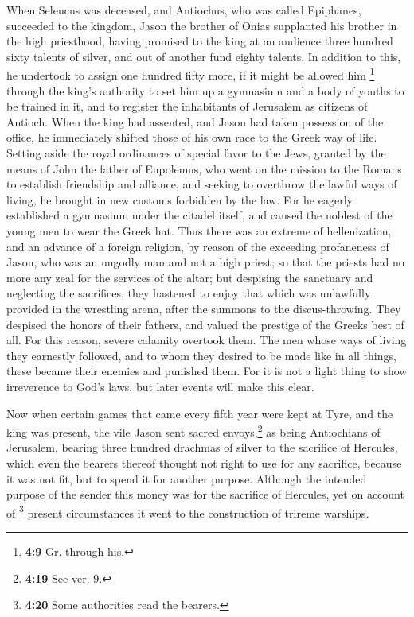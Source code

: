  When Seleucus was deceased, and Antiochus, who was called
Epiphanes, succeeded to the kingdom, Jason the brother of Onias
supplanted his brother in the high priesthood,  having
promised to the king at an audience three hundred sixty talents of
silver, and out of another fund eighty talents.  In
addition to this, he undertook to assign one hundred fifty more, if it
might be allowed him \footnote{\textbf{4:9} Gr. through his.} through
the king's authority to set him up a gymnasium and a body of youths to
be trained in it, and to register the inhabitants of Jerusalem as
citizens of Antioch.  When the king had assented, and
Jason had taken possession of the office, he immediately shifted those
of his own race to the Greek way of life.  Setting aside
the royal ordinances of special favor to the Jews, granted by the means
of John the father of Eupolemus, who went on the mission to the Romans
to establish friendship and alliance, and seeking to overthrow the
lawful ways of living, he brought in new customs forbidden by the law.
 For he eagerly established a gymnasium under the citadel
itself, and caused the noblest of the young men to wear the Greek hat.
 Thus there was an extreme of hellenization, and an
advance of a foreign religion, by reason of the exceeding profaneness of
Jason, who was an ungodly man and not a high priest;  so
that the priests had no more any zeal for the services of the altar; but
despising the sanctuary and neglecting the sacrifices, they hastened to
enjoy that which was unlawfully provided in the wrestling arena, after
the summons to the discus-throwing.  They despised the
honors of their fathers, and valued the prestige of the Greeks best of
all.  For this reason, severe calamity overtook them. The
men whose ways of living they earnestly followed, and to whom they
desired to be made like in all things, these became their enemies and
punished them.  For it is not a light thing to show
irreverence to God's laws, but later events will make this clear.

 Now when certain games that came every fifth year were
kept at Tyre, and the king was present,  the vile Jason
sent sacred envoys,\footnote{\textbf{4:19} See ver. 9.} as being
Antiochians of Jerusalem, bearing three hundred drachmas of silver to
the sacrifice of Hercules, which even the bearers thereof thought not
right to use for any sacrifice, because it was not fit, but to spend it
for another purpose.  Although the intended purpose of
the sender this money was for the sacrifice of Hercules, yet on account
of \footnote{\textbf{4:20} Some authorities read the bearers.} present
circumstances it went to the construction of trireme warships.

